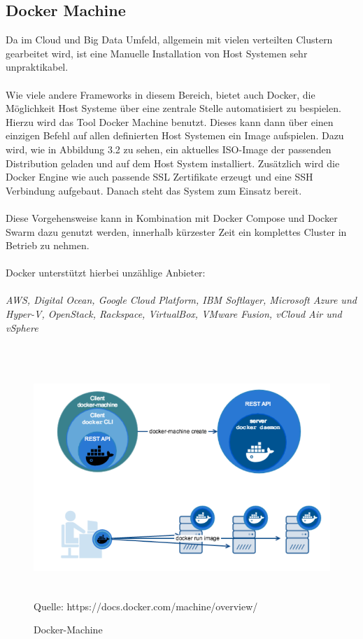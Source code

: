 \documentclass[12pt,toc=bib,toc=listof]{scrreprt}
\begin{document}
\subsection{Docker Machine}
Da im Cloud und Big Data Umfeld, allgemein mit vielen verteilten Clustern gearbeitet wird, ist eine Manuelle Installation von Host Systemen sehr unpraktikabel.\\
\\
Wie viele andere Frameworks in diesem Bereich, bietet auch Docker, die Möglichkeit Host Systeme über eine zentrale Stelle automatisiert zu bespielen.
Hierzu wird das Tool Docker Machine benutzt.
Dieses kann dann über einen einzigen Befehl auf allen definierten Host Systemen ein Image aufspielen.
Dazu wird, wie in Abbildung 3.2 zu sehen, ein aktuelles ISO-Image der passenden Distribution geladen und auf dem Host System installiert.
Zusätzlich wird die Docker Engine wie auch passende SSL Zertifikate erzeugt und eine SSH Verbindung aufgebaut. 
Danach steht das System zum Einsatz bereit.\\
\\
Diese Vorgehensweise kann in Kombination mit Docker Compose und Docker Swarm dazu genutzt werden, innerhalb kürzester Zeit ein komplettes Cluster in Betrieb zu nehmen.\\
\\
Docker unterstützt hierbei unzählige Anbieter:\\
\\
\textit{AWS, Digital Ocean, Google Cloud Platform, IBM Softlayer, Microsoft Azure und Hyper-V, OpenStack, Rackspace, VirtualBox, VMware Fusion, vCloud Air und vSphere}\\
\\
\begin{figure}
	\centering
	\caption{Docker-Machine}
	\includegraphics[width=15cm, height=9cm, scale=0.3]{docker-machine.png}
	Quelle: https://docs.docker.com/machine/overview/
\end{figure}
\end{document}
